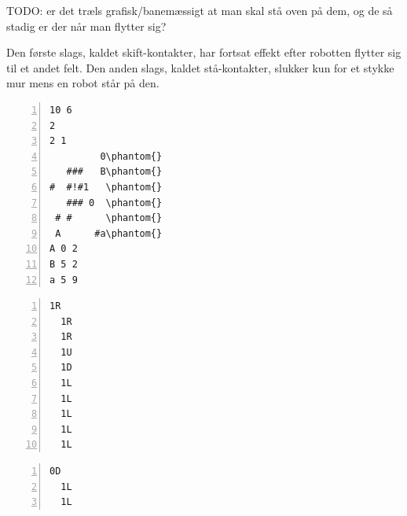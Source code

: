 \documentclass[10pt, a4paper]{article}
\begin{document}
TODO: er det træls grafisk/banemæssigt at man skal stå oven på dem, og de så stadig er der når man flytter sig?

Den første slags, kaldet skift-kontakter, har fortsat effekt efter robotten flytter sig til et andet felt.
Den anden slags, kaldet stå-kontakter, slukker kun for et stykke mur mens en robot står på den.

\newsavebox{\simpleboard}
\begin{lrbox}\simpleboard%
\hspace{1cm}
\begin{minipage}[b]{2.1cm}%
\begin{Verbatim}[frame=single, numbers=left, showspaces, commandchars=\\\{\}, baselinestretch=0.64]
10 6
2
2 1
         0\phantom{}
   ###   B\phantom{}
#  #!#1   \phantom{}
   ### 0  \phantom{}
 # #      \phantom{}
 A      #a\phantom{}
A 0 2
B 5 2
a 5 9
\end{Verbatim}
\end{minipage} 
\hspace{1cm}
\end{lrbox}

\newsavebox{\simpleboardsolution}
\begin{lrbox}\simpleboardsolution%
\hspace{1cm}
\begin{minipage}[b]{2.1cm}%
\begin{Verbatim}[frame=single, numbers=left,showspaces, commandchars=\\\{\}, baselinestretch=0.64, label={\scriptsize Løsning 1}]
  1R
  1R
  1R
  1U
  1D
  1L
  1L
  1L
  1L
  1L
\end{Verbatim}
\vspace{-4pt}
\begin{Verbatim}[frame=single, numbers=left,showspaces, commandchars=\\\{\}, baselinestretch=0.64, label={\scriptsize Løsning 2}]
  0D
  1L
  1L
\end{Verbatim}
\end{minipage}
\hspace{1cm}
\end{lrbox}
\end{document}

